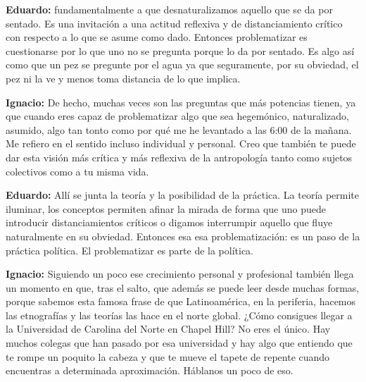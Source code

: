 \documentclass[
]{interact}
\begin{document}
\textbf{Eduardo:} fundamentalmente a que desnaturalizamos aquello que se
da por sentado. Es una invitación a una actitud reflexiva y de
distanciamiento crítico con respecto a lo que se asume como dado.
Entonces problematizar es cuestionarse por lo que uno no se pregunta
porque lo da por sentado. Es algo así como que un pez se pregunte por el
agua ya que seguramente, por su obviedad, el pez ni la ve y menos toma
distancia de lo que implica.

\textbf{Ignacio:} De hecho, muchas veces son las preguntas que más
potencias tienen, ya que cuando eres capaz de problematizar algo que sea
hegemónico, naturalizado, asumido, algo tan tonto como por qué me he
levantado a las 6:00 de la mañana. Me refiero en el sentido incluso
individual y personal. Creo que también te puede dar esta visión más
crítica y más reflexiva de la antropología tanto como sujetos colectivos
como a tu misma vida.

\textbf{Eduardo:} Allí se junta la teoría y la posibilidad de la
práctica. La teoría permite iluminar, los conceptos permiten afinar la
mirada de forma que uno puede introducir distanciamientos críticos o
digamos interrumpir aquello que fluye naturalmente en su obviedad.
Entonces esa esa problematización: es un paso de la práctica política.
El problematizar es parte de la política.

\textbf{Ignacio:} Siguiendo un poco ese crecimiento personal y
profesional también llega un momento en que, tras el salto, que además
se puede leer desde muchas formas, porque sabemos esta famosa frase de
que Latinoamérica, en la periferia, hacemos las etnografías y las
teorías las hace en el norte global. ¿Cómo consigues llegar a la
Universidad de Carolina del Norte en Chapel Hill? No eres el único. Hay
muchos colegas que han pasado por esa universidad y hay algo que
entiendo que te rompe un poquito la cabeza y que te mueve el tapete de
repente cuando encuentras a determinada aproximación. Háblanos un poco
de eso.
\end{document}
